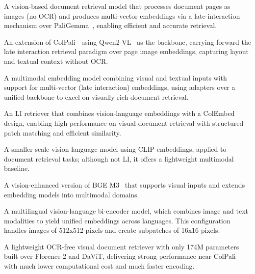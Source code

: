 A vision-based document retrieval model that processes document pages as images (no OCR) and produces multi-vector embeddings via a late-interaction mechanism over PaliGemma~, enabling efficient and accurate retrieval.

An extension of ColPali~ using Qwen2-VL~ as the backbone, carrying forward the late interaction retrieval paradigm over page image embeddings, capturing layout and textual context without OCR.

A multimodal embedding model combining visual and textual inputs with support for multi-vector (late interaction) embeddings, using adapters over a unified backbone to excel on visually rich document retrieval.

An LI retriever that combines vision-language embeddings with a ColEmbed design, enabling high performance on visual document retrieval with structured patch matching and efficient similarity.

A smaller scale vision-language model using CLIP embeddings, applied to document retrieval tasks; although not LI, it offers a lightweight multimodal baseline.

A vision-enhanced version of BGE M3~ that supports visual inputs and extends embedding models into multimodal domains.

A multilingual vision-language bi-encoder model, which combines image and text modalities to yield unified embeddings across languages. This configuration handles images of 512x512 pixels and create subpatches of 16x16 pixels.

A lightweight OCR-free visual document retriever with only 174M parameters built over Florence-2 and DaViT, delivering strong performance near ColPali with much lower computational cost and much faster encoding.


